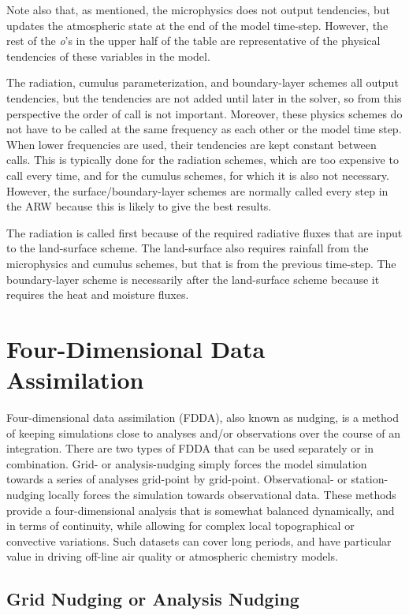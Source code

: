 Note also that, as mentioned, the microphysics does not output tendencies,
but updates the atmospheric state at the end of the model time-step. 
However, the rest of the {\em o}'s in the upper half of the table are
representative of the physical tendencies of these variables in the model.

The radiation, cumulus parameterization, and boundary-layer schemes all
output tendencies, but the tendencies are not added until later in the solver, so
from this perspective the order of call is not important. Moreover, these
physics schemes do not have to be called at the same frequency as each other
or the model time step. When lower frequencies are used, their tendencies
are kept constant between calls. This is typically done for the radiation schemes,
which are too expensive to call every time, and for the cumulus schemes, for
which it is also not necessary. However, the surface/boundary-layer schemes are
normally called every step in the ARW because this is likely to give the best results.

The radiation is called first because of the required radiative fluxes
that are input to the land-surface scheme. The land-surface also requires rainfall
from the microphysics and cumulus schemes, but that is from the previous time-step.
The boundary-layer scheme is necessarily after the land-surface scheme
because it requires the heat and moisture fluxes.

\section{Four-Dimensional Data Assimilation}

Four-dimensional data assimilation (FDDA), also known as nudging, is a method of keeping
simulations close to analyses and/or observations over the course of an
integration. There are two types of FDDA that can be used separately or in
combination. Grid- or analysis-nudging simply forces the model simulation 
towards a series of analyses grid-point by grid-point. Observational- or station-nudging
locally forces the simulation towards observational data. These methods
provide a four-dimensional analysis that is somewhat balanced dynamically,
and in terms of continuity,
while allowing for complex local topographical or convective variations.
Such datasets can cover long periods, and have particular value in driving
off-line air quality or atmospheric chemistry models.

\subsection{Grid Nudging or Analysis Nudging}

